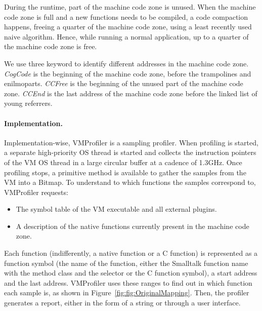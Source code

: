 \documentclass[10pt,preprint,nonatbib]{sigplanconf}
\newcommand{\figref}[1]{Figure~\ref{fig:#1}}
\begin{document}
During the runtime, part of the machine code zone is unused. When the machine code zone is full and a new functions needs to be compiled, a code compaction happens, freeing a quarter of the machine code zone, using a least recently used naive algorithm. Hence, while running a normal application, up to a quarter of the machine code zone is free. 

We use three keyword to identify different addresses in the machine code zone. \emph{CogCode} is the beginning of the machine code zone, before the trampolines and enilmoparts. \emph{CCFree} is the beginning of the unused part of the machine code zone. \emph{CCEnd} is the last address of the machine code zone before the linked list of young referrers.

\paragraph{Implementation.} Implementation-wise, VMProfiler is a sampling profiler. When profiling is started, a separate high-priority OS thread is started and collects the instruction pointers of the VM OS thread in a large circular buffer at a cadence of 1.3GHz. Once profiling stops, a primitive method is available to gather the samples from the VM into a Bitmap. To understand to which functions the samples correspond to, VMProfiler requests:
\begin{itemize}
	\item The symbol table of the VM executable and all external plugins.
	\item A description of the native functions currently present in the machine code zone.
\end{itemize}
Each function (indifferently, a native function or a C function) is represented as a function symbol (the name of the function, either the Smalltalk function name with the method class and the selector or the C function symbol), a start address and the last address. VMProfiler uses these ranges to find out in which function each sample is, as shown in \figref{fig:OriginalMapping}. Then, the profiler generates a report, either in the form of a string or through a user interface.
\end{document}
